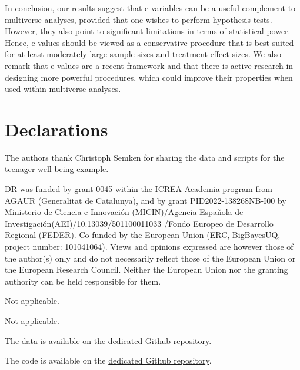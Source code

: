 \documentclass[pdflatex,sn-mathphys-num]{sn-jnl}%
\theoremstyle{thmstyleone}%
\theoremstyle{thmstyletwo}%
\theoremstyle{thmstylethree}%
\begin{document}
In conclusion, our results suggest that e-variables can be a useful complement to multiverse analyses, provided that one wishes to perform hypothesis tests. However, they also point to significant limitations in terms of statistical power. Hence, e-values should be viewed as a conservative procedure that is best suited for at least moderately large sample sizes and treatment effect sizes. We also remark that e-values are a recent framework and that there is active research in designing more powerful procedures, which could improve their properties when used within multiverse analyses.


\backmatter

% 
% 


\section*{Declarations}

The authors thank Christoph Semken for sharing the data and scripts for the teenager well-being example.



DR was funded by grant 0045 within the ICREA Academia program from AGAUR (Generalitat de Catalunya), and by grant PID2022-138268NB-I00 by Ministerio de Ciencia e Innovaci\'on (MICIN)/Agencia Espa\~{n}ola de Investigaci\'on(AEI)/10.13039/501100011033 /Fondo Europeo de Desarrollo Regional (FEDER). Co-funded by the European Union (ERC, BigBayesUQ, project number: 101041064). Views and opinions expressed are however those of the author(s) only and do not necessarily reflect those of the European Union or the European Research Council. Neither the European Union nor the granting authority can be held responsible for them.


Not applicable.


Not applicable.


The data is available on the \href{https://github.com/paulrognonvael/multiverse.evalues}{dedicated Github repository}.


The code is available on the \href{https://github.com/paulrognonvael/multiverse.evalues}{dedicated Github repository}.
\end{document}
